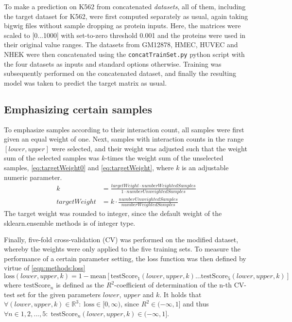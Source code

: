 To make a prediction on K562 from concatenated \emph{datasets},
all of them, including the target dataset for K562, were first computed separately as usual, 
again taking bigwig files without sample dropping as protein inputs.
Here, the matrices were scaled to [0...1000] with set-to-zero threshold 0.001 and the proteins were used
in their original value ranges.
The datasets from GM12878, HMEC, HUVEC and NHEK were then concatenated 
using the \texttt{concatTrainSet.py} python script \cite{Krauth2020} with the four
datasets as inputs and standard options otherwise.
Training was subsequently performed on the concatenated dataset, and finally
the resulting model was taken to predict the target matrix as usual.

\subsection{Emphasizing certain samples} \label{sec:methods:emphasizing}
To emphasize samples according to their interaction count, 
all samples were first given an equal weight of one.
Next, samples with interaction counts in the range $[lower, upper]$ were selected,
and their weight was adjusted such that the weight sum of the selected samples
was $k$-times the weight sum of the unselected samples, \autoref{eq:targetWeight0} and \ref{eq:targetWeight},
where $k$ is an adjustable numeric parameter.
\bgroup
 \small
\begin{align}
 k &= \frac{targetWeight \cdot numberWeightedSamples}{1 \cdot numberUnweightedSamples} \label{eq:targetWeight0}\\ 
 targetWeight &= k \cdot \frac{numberUnweightedSamples}{numberWeightedSamples} \label{eq:targetWeight}
\end{align} \egroup
The target weight was rounded to integer, 
since the default weight of the sklearn.ensemble methods is of integer type.

Finally, five-fold cross-validation (CV) was performed on the modified dataset,
whereby the weights were only applied to the five training sets.
To measure the performance of a certain parameter setting, the loss function was then defined by virtue of \autoref{eqn:methods:loss}
\bgroup
\small
\begin{equation} \label{eqn:methods:loss}
 \textrm{loss}(lower,upper,k) = 1 - \textrm{mean}[\textrm{testScore}_1(lower,upper,k)...\textrm{testScore}_5(lower,upper,k)]
\end{equation} \egroup
where $\textrm{testScore}_n$ is defined as the $R^2$-coefficient of determination of the n-th CV-test set for the given
parameters $lower$, $upper$ and $k$.
It holds that $\forall (lower,upper,k) \in \mathbb{R}^3:\; \textrm{loss} \in [0,\infty)$, 
since $R^2 \in (-\infty,1]$ and thus 
$\forall n \in 1,2,...,5:\; \textrm{testScore}_n(lower,upper,k) \in (-\infty,1]$.

